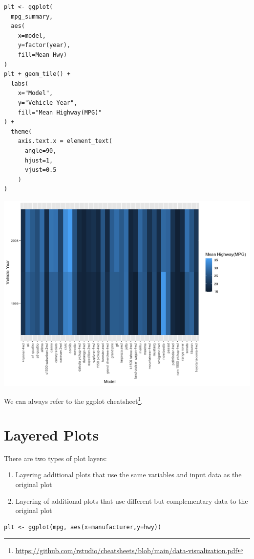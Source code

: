 \documentclass[11pt]{article}
\begin{document}
\begin{verbatim}
plt <- ggplot(
  mpg_summary,
  aes(
    x=model,
    y=factor(year),
    fill=Mean_Hwy)
)
plt + geom_tile() +
  labs(
    x="Model",
    y="Vehicle Year",
    fill="Mean Highway(MPG)"
) +
  theme(
    axis.text.x = element_text(
      angle=90,
      hjust=1,
      vjust=0.5
    )
)
\end{verbatim}

\begin{org}
\begin{center}
\includegraphics[width=.9\linewidth]{./resources/mpg_heatmap2.png}
\end{center}
\end{org}

We can always refer to the ggplot cheatsheet\footnote{\url{https://github.com/rstudio/cheatsheets/blob/main/data-visualization.pdf}}.

\section{Layered Plots}
\label{sec:org78f78d9}

There are two types of plot layers:

\begin{enumerate}
\item Layering additional plots that use the same variables and input data as the original plot
\item Layering of additional plots that use different but complementary data to the original plot
\end{enumerate}

\begin{verbatim}
plt <- ggplot(mpg, aes(x=manufacturer,y=hwy))
\end{verbatim}
\end{document}
